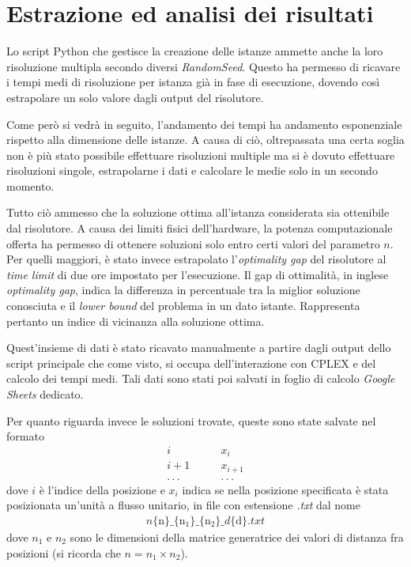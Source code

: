 
\section{Estrazione ed analisi dei risultati}
Lo script Python che gestisce la creazione delle istanze ammette anche la loro risoluzione multipla secondo diversi \textit{RandomSeed}. 
Questo ha permesso di ricavare i tempi medi di risoluzione per istanza già in fase di esecuzione, dovendo così estrapolare un solo valore 
dagli output del risolutore. 

Come però si vedrà in seguito, l'andamento dei tempi ha andamento esponenziale rispetto alla dimensione delle istanze. A causa di ciò, oltrepassata 
una certa soglia non è più stato possibile effettuare risoluzioni multiple ma si è dovuto effettuare risoluzioni singole, estrapolarne i dati 
e calcolare le medie solo in un secondo momento.

Tutto ciò ammesso che la soluzione ottima all'istanza considerata sia ottenibile dal risolutore. A causa dei limiti fisici dell'hardware, 
la potenza computazionale offerta ha permesso di ottenere soluzioni solo entro certi valori del parametro $n$. Per quelli maggiori, è stato invece estrapolato l'\textit{optimality gap} 
del risolutore al \textit{time limit} di due ore impostato per l'esecuzione. Il gap di ottimalità, in inglese \textit{optimality gap}, indica la differenza 
in percentuale tra la miglior soluzione conosciuta e il \textit{lower bound} del problema in un dato istante. Rappresenta pertanto un indice di vicinanza 
alla soluzione ottima.

Quest'insieme di dati è stato ricavato manualmente a partire dagli output dello script principale che come visto, 
si occupa dell'interazione con CPLEX e del calcolo dei tempi medi. Tali dati sono stati poi salvati in foglio di calcolo \textit{Google Sheets} 
\cite{conner2008google} dedicato.

\noindent
Per quanto riguarda invece le soluzioni trovate, queste sono state salvate nel formato 
\begin{align*}
    i   &\qquad x_i \\
    i+1 &\qquad x_{i+1} \\
    .\, .\, . &\qquad .\, .\, .
\end{align*}
dove $i$ è l'indice della posizione e $x_i$ indica se nella posizione specificata è stata posizionata un'unità a flusso unitario, 
in file con estensione \textit{.txt} dal nome
\begin{align*}
    n\{\text{n}\}\_\{\text{n}_1\}\_\{\text{n}_2\}\_d\{\text{d}\}.txt
\end{align*}
dove $n_1$ e $n_2$ sono le dimensioni della matrice generatrice dei valori di distanza fra posizioni (si ricorda che $n=n_1\times n_2$).


